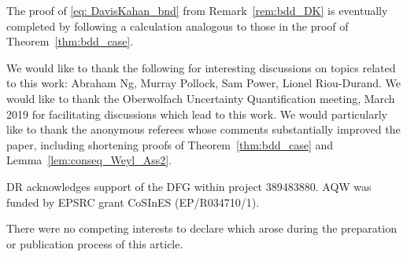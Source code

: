 \documentclass{aptpub}
\begin{document}
The proof of \eqref{eq: DavisKahan_bnd} from Remark~\ref{rem:bdd_DK} is eventually completed by following a calculation analogous to those in the proof of Theorem~\ref{thm:bdd_case}.






\acks %
\noindent We would like to thank the following for interesting discussions on topics related to this work: Abraham Ng, Murray Pollock, Sam Power, Lionel Riou-Durand. We would like to thank the Oberwolfach Uncertainty Quantification meeting, March 2019 for facilitating discussions which lead to this work. We would particularly like to thank the anonymous referees whose comments substantially improved the paper, including shortening proofs of Theorem~\ref{thm:bdd_case} and Lemma~\ref{lem:conseq_Weyl_Ass2}.



\fund %
\noindent DR acknowledges support of the
DFG within project 389483880.
AQW was funded by EPSRC grant CoSInES (EP/R034710/1).



\competing %
\noindent There were no competing interests to declare which arose during the preparation or publication process of this article.










\end{document}
